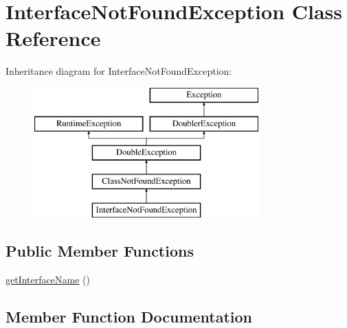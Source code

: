\hypertarget{class_prophecy_1_1_exception_1_1_doubler_1_1_interface_not_found_exception}{}\section{Interface\+Not\+Found\+Exception Class Reference}
\label{class_prophecy_1_1_exception_1_1_doubler_1_1_interface_not_found_exception}
Inheritance diagram for Interface\+Not\+Found\+Exception\+:\begin{figure}[H]
\begin{center}
\leavevmode
\includegraphics[height=5.000000cm]{class_prophecy_1_1_exception_1_1_doubler_1_1_interface_not_found_exception}
\end{center}
\end{figure}
\subsection*{Public Member Functions}
\begin{DoxyCompactItemize}
\item 
\mbox{\hyperlink{class_prophecy_1_1_exception_1_1_doubler_1_1_interface_not_found_exception_a8ca74a4d6b8ab61e7276e2718d7c1490}{get\+Interface\+Name}} ()
\end{DoxyCompactItemize}


\subsection{Member Function Documentation}
\mbox{\label{class_prophecy_1_1_exception_1_1_doubler_1_1_interface_not_found_exception_a8ca74a4d6b8ab61e7276e2718d7c1490}} 
